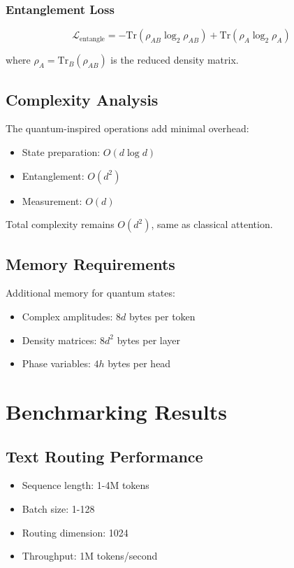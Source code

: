 \documentclass[10pt]{article}
\begin{document}
\subsubsection{Entanglement Loss}
\begin{equation}
    \mathcal{L}_{\text{entangle}} = -\text{Tr}(\rho_{AB}\log_2\rho_{AB}) + \text{Tr}(\rho_A\log_2\rho_A)
\end{equation}

where $\rho_A = \text{Tr}_B(\rho_{AB})$ is the reduced density matrix.

\subsection{Complexity Analysis}
The quantum-inspired operations add minimal overhead:

\begin{itemize}
    \item State preparation: $O(d\log d)$
    \item Entanglement: $O(d^2)$
    \item Measurement: $O(d)$
\end{itemize}

Total complexity remains $O(d^2)$, same as classical attention.

\subsection{Memory Requirements}
Additional memory for quantum states:

\begin{itemize}
    \item Complex amplitudes: $8d$ bytes per token
    \item Density matrices: $8d^2$ bytes per layer
    \item Phase variables: $4h$ bytes per head
\end{itemize}

\section{Benchmarking Results}

\subsection{Text Routing Performance}
\begin{itemize}
    \item Sequence length: 1-4M tokens
    \item Batch size: 1-128
    \item Routing dimension: 1024
    \item Throughput: 1M tokens/second
\end{itemize}
\end{document}
